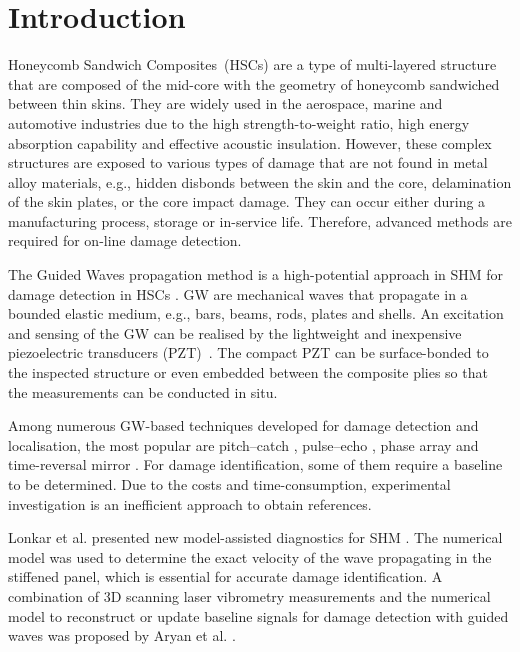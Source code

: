 \documentclass[sensors,article,accept,moreauthors,pdftex]{Definitions/mdpi}
\begin{document}
\section{Introduction}
\label{sec:intro}


Honeycomb %
 Sandwich Composites~(HSCs) are a type of multi-layered structure that are composed of the mid-core with the geometry of honeycomb sandwiched between thin skins.
They are widely used in the aerospace, marine and automotive industries due to the high strength-to-weight ratio, high energy absorption capability and effective acoustic insulation.
However, these complex structures are exposed to various types of damage that are not found in metal alloy materials, e.g., hidden disbonds between the skin and the core, delamination of the skin plates, or the core impact damage.
They can occur either during a manufacturing process, storage or in-service life.
Therefore, advanced methods are required for on-line damage detection.

The Guided Waves propagation method is a high-potential approach in SHM for damage detection in  HSCs \cite{mustapha2011assessment, sikdar2016guided, sikdar2016ultrasonic,radzienski2016assessment, yu2019core}.
GW are mechanical waves that propagate in a bounded elastic medium, e.g., bars, beams, rods, plates and shells.
An excitation and sensing of the GW can be realised by the lightweight and inexpensive piezoelectric transducers (PZT)~\cite{giurgiutiumicromechatronics}.
The compact PZT can be surface-bonded to the inspected structure or even embedded between the composite plies so that the measurements can be conducted in situ.


Among numerous GW-based techniques developed for damage detection and localisation, the most popular are pitch--catch \cite{ihn2008pitch, sikdar2017structural}, pulse--echo \cite{guo1993interaction, kudela2008damage}, phase array \cite{lu2006crack, ostachowicz2008elastic} and time-reversal mirror \cite{fink1992time, eremin2016analytically}.
For damage identification, some of them require a baseline to be determined.
Due to the costs and time-consumption, experimental investigation is an inefficient approach to obtain references.

Lonkar et al. presented new model-assisted diagnostics for SHM \cite{lonkar2012model}.
The numerical model was used to determine the exact velocity of the wave propagating in the stiffened panel, which is essential for accurate damage identification.
A combination of 3D scanning laser vibrometry measurements and the numerical model to reconstruct or update baseline signals for damage detection with guided waves was proposed by Aryan et al. \cite{aryan2017formulation}.
\end{document}
